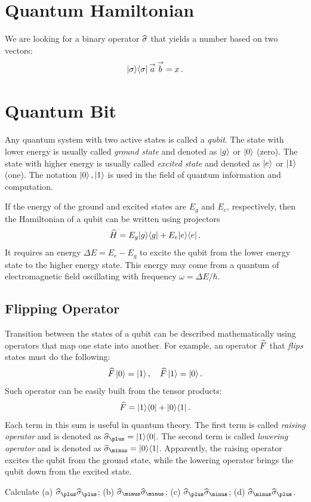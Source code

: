 \section{Quantum Hamiltonian}\label{sec:QuantumHamiltonian}
We are looking for a binary operator $\widehat{\sigma}$ that yields a number
based on two vectors:
\[
|{\sigma}\rangle\langle{\sigma}|\,\overset{\rightarrow}{a}\,\overset{\rightarrow}{b}=x\,.
\]


\section{Quantum Bit}\label{sec:Qubit}
Any quantum system with two active states is called a \emph{qubit}. The state with lower energy is usually called \emph{ground state} and denoted as $|{g}\rangle$ or $|{0}\rangle$ (zero). The state with higher energy is usually called \emph{excited state} and denoted as $|{e}\rangle$ or $|{1}\rangle$ (one). The notation $|{0}\rangle\,,|{1}\rangle$ is used in the field of quantum information and computation.

If the energy of the ground and excited states are $E_g$ and $E_e$, respectively, then the Hamiltonian of a qubit can be written using projectors
\[
\widehat{H} = E_g|{g}\rangle\langle{g}|+E_e|{e}\rangle\langle{e}|\,.
\]
It requires an energy $\Delta E=E_e-E_g$ to excite the qubit from the lower energy state to the higher energy state. This energy may come from a quantum of electromagnetic field oscillating with frequency $\omega=\Delta E/\hbar$.

\subsection{Flipping Operator}
Transition between the states of a qubit can be described mathematically using operators that map one state into another. For example, an operator $\widehat{F}$ that \emph{flips} states must do the following:
\[
\widehat{F}\,|{0}\rangle=|{1}\rangle\,,\quad \widehat{F}\,|{1}\rangle=|{0}\rangle\,.
\]
Such operator can be easily built from the tensor products:
\[
\widehat{F} = |{1}\rangle\langle{0}|+|{0}\rangle\langle{1}|\,.
\]
Each term in this sum is useful in quantum theory. The first term is called \emph{raising operator} and is denoted as 
$ \op{\sigma}_\plus=\ketbra{1}{0}$. The second term is called \emph{lowering operator} and is denoted as $ \op{\sigma}_\minus=\ketbra{0}{1}$. Apparently, the raising operator excites the qubit from the ground state, while the lowering operator brings the qubit down from the excited state.

\begin{exercise}
	Calculate (a) $\op{\sigma}_\plus \op{\sigma}_\plus$; (b) $\op{\sigma}_\minus \op{\sigma}_\minus$; (c) $\op{\sigma}_\plus \op{\sigma}_\minus$; (d) $\op{\sigma}_\minus \op{\sigma}_\plus$.
\end{exercise}

